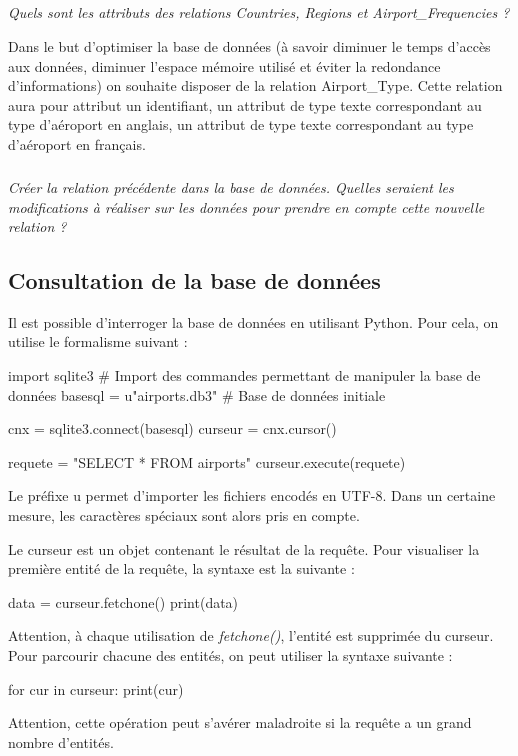 \documentclass[10pt]{article}
\begin{document}
\subparagraph{}
\textit{Quels sont les attributs des relations \textsf{Countries}, \textsf{Regions} et \textsf{Airport\_Frequencies} ?}

Dans le but d'optimiser la base de données (à savoir diminuer le temps d'accès aux données, diminuer l'espace mémoire utilisé et éviter la redondance d'informations) on souhaite disposer de la relation \textsf{Airport\_Type}. Cette relation aura pour attribut un identifiant, un attribut de type texte correspondant au type d'aéroport en anglais, un attribut de type texte correspondant au type d'aéroport en français. 

\subparagraph{}
\textit{Créer la relation précédente dans la base de données. Quelles seraient les modifications à réaliser sur les données pour prendre en compte cette nouvelle relation ?}

\subsection*{Consultation de la base de données}

Il est possible d'interroger la base de données en utilisant Python. Pour cela, on utilise le formalisme suivant :

\begin{py}
\begin{python}
import sqlite3 # Import des commandes permettant de manipuler la base de données
basesql = u"airports.db3" # Base de données initiale

cnx = sqlite3.connect(basesql)
curseur = cnx.cursor()

requete = "SELECT * FROM airports"
curseur.execute(requete)
\end{python}

Le préfixe u permet d'importer les fichiers encodés en UTF-8. Dans un certaine mesure, les caractères spéciaux sont alors pris en compte.\end{py}


\begin{py}
Le curseur est un objet contenant le résultat de la requête. Pour visualiser la première entité de la requête, la syntaxe est la suivante : 
\begin{python}
data = curseur.fetchone()
print(data)
\end{python}

Attention, à chaque utilisation de \textsl{fetchone()}, l'entité est supprimée du curseur. Pour parcourir chacune des entités, on peut utiliser la syntaxe suivante : 
\begin{python}
for cur in curseur:
    print(cur)
\end{python}

Attention, cette opération peut s'avérer maladroite si la requête a un grand nombre d'entités. 
\end{py}
\end{document}
